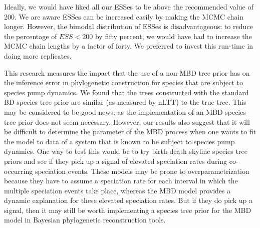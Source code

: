 Ideally, we would have liked all our ESSes to be above the recommended value of 
200. We are aware ESSes can be increased easily by
making the MCMC chain longer. However, the bimodal
distribution of ESSes is disadvantageous: to reduce the percentage 
of $ESS < 200$ by fifty percent,
we would have had to increase the MCMC chain lengths by a factor of forty.
We preferred to invest this run-time in doing more replicates.

This research measures the impact that the use of a non-MBD tree prior 
has on the inference error in phylogenetic construction for species that are subject to species pump dynamics.
We found that the trees constructed with the standard BD species tree prior are similar (as measured by nLTT) to the true tree. This may be considered to be good news, as the implementation of an MBD species tree prior does not seem necessary. However, our results also suggest that it will be difficult to determine the parameter of the MBD process when one wants to fit the model to data of a system that is known to be subject to species pump dynamics. One way to test this would be to try  birth-death skyline species tree priors and see if they pick up a signal of elevated speciation rates during co-occurring speciation events. These models may be prone to overparametrization because they have to assume a speciation rate for each interval in which the multiple speciation events take place, whereas the MBD model provides a dynamic explanation for these elevated speciation rates. But if they do pick up a signal, then it may still be worth implementing a species tree prior for the MBD model in Bayesian phylogenetic reconstruction tools. 


